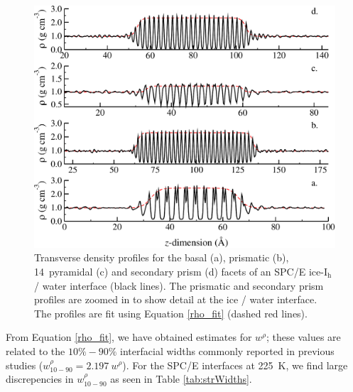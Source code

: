 \begin{figure}
\includegraphics[width=\linewidth]{Figures/transDensity}
\caption{\label{fig:transDensity}Transverse density profiles for the
  basal (a), prismatic (b), 14\degree~pyramidal (c) and secondary prism (d)
  facets of an SPC/E ice-I$_\mathrm{h}$ / water interface (black
  lines). The prismatic and secondary prism profiles are zoomed in to
  show detail at the ice / water interface. The profiles are fit using
  Equation \eqref{rho_fit} (dashed red lines).}
\end{figure}

From Equation \eqref{rho_fit}, we have obtained estimates for $w^{\rho}$;
these values are related to the $10\%-90\%$ interfacial widths
commonly reported in previous studies
($w_\mathrm{10-90}^{\rho} = 2.197~w^{\rho}$).\cite{Bryk2002,Bryk2004}
For the SPC/E interfaces at 225~K, we find large discrepencies in
$w_\mathrm{10-90}^{\rho}$ as seen in Table \ref{tab:strWidths}.

